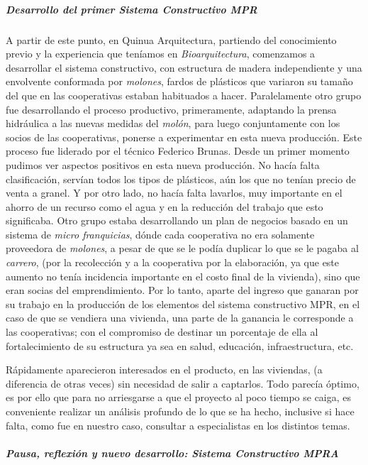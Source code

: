 \documentclass[
]{article}
\begin{document}
\hypertarget{desarrollo-del-primer-sistema-constructivo-mpr}{%
\subparagraph{Desarrollo del primer Sistema Constructivo
MPR}\label{desarrollo-del-primer-sistema-constructivo-mpr}}

A partir de este punto, en Quinua Arquitectura, partiendo del
conocimiento previo y la experiencia que teníamos en
\emph{Bioarquitectura}, comenzamos a desarrollar el sistema
constructivo, con estructura de madera independiente y una envolvente
conformada por \emph{molones}, fardos de plásticos que variaron su
tamaño del que en las cooperativas estaban habituados a hacer.
Paralelamente otro grupo fue desarrollando el proceso productivo,
primeramente, adaptando la prensa hidráulica a las nuevas medidas del
\emph{molón}, para luego conjuntamente con los socios de las
cooperativas, ponerse a experimentar en esta nueva producción. Este
proceso fue liderado por el técnico Federico Brunas. Desde un primer
momento pudimos ver aspectos positivos en esta nueva producción. No
hacía falta clasificación, servían todos los tipos de plásticos, aún los
que no tenían precio de venta a granel. Y por otro lado, no hacía falta
lavarlos, muy importante en el ahorro de un recurso como el agua y en la
reducción del trabajo que esto significaba. Otro grupo estaba
desarrollando un plan de negocios basado en un sistema de \emph{micro
franquicias}, dónde cada cooperativa no era solamente proveedora de
\emph{molones}, a pesar de que se le podía duplicar lo que se le pagaba
al \emph{carrero}, (por la recolección y a la cooperativa por la
elaboración, ya que este aumento no tenía incidencia importante en el
costo final de la vivienda), sino que eran socias del emprendimiento.
Por lo tanto, aparte del ingreso que ganaran por su trabajo en la
producción de los elementos del sistema constructivo MPR, en el caso de
que se vendiera una vivienda, una parte de la ganancia le corresponde a
las cooperativas; con el compromiso de destinar un porcentaje de ella al
fortalecimiento de su estructura ya sea en salud, educación,
infraestructura, etc.

Rápidamente aparecieron interesados en el producto, en las viviendas, (a
diferencia de otras veces) sin necesidad de salir a captarlos. Todo
parecía óptimo, es por ello que para no arriesgarse a que el proyecto al
poco tiempo se caiga, es conveniente realizar un análisis profundo de lo
que se ha hecho, inclusive si hace falta, como fue en nuestro caso,
consultar a especialistas en los distintos temas.

\hypertarget{pausa-reflexiuxf3n-y-nuevo-desarrollo-sistema-constructivo-mpra}{%
\subparagraph{Pausa, reflexión y nuevo desarrollo: Sistema Constructivo
MPRA}\label{pausa-reflexiuxf3n-y-nuevo-desarrollo-sistema-constructivo-mpra}}
\end{document}
